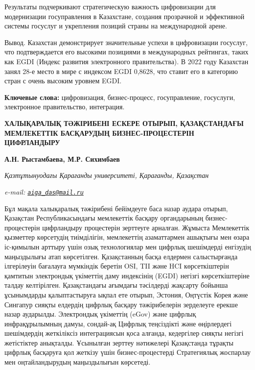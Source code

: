 Результаты подчеркивают стратегическую важность цифровизации для
модернизации госуправления в Казахстане, создания прозрачной и
эффективной системы госуслуг и укрепления позиций страны на
международной арене.

Вывод. Казахстан демонстрирует значительные успехи в цифровизации
госуслуг, что подтверждается его высокими позициями в международных
рейтингах, таких как EGDI (Индекс развития электронного правительства).
В 2022 году Казахстан занял 28-е место в мире с индексом EGDI 0,8628,
что ставит его в категорию стран с очень высоким уровнем EGDI.

{\bfseries Ключевые слова:} цифровизация, бизнес-процесс, госуправление,
госуслуги, электронное правительство, интеграция.

\begin{articleheader}
{\bfseries ХАЛЫҚАРАЛЫҚ ТӘЖІРИБЕНІ ЕСКЕРЕ ОТЫРЫП, ҚАЗАҚСТАНДАҒЫ МЕМЛЕКЕТТІК БАСҚАРУДЫҢ БИЗНЕС-ПРОЦЕСТЕРІН ЦИФРЛАНДЫРУ}

{\bfseries  
А.Н. Рыстамбаева\textsuperscript{\envelope },  
М.Р. Сихимбаев}
\end{articleheader}

\begin{affiliation}
\emph{Қазтұтынуодағы Қарағанды университеті, Қарағанды, Қазақстан}

\emph{e-mail: \href{mailto:aiga_das@mail.ru}{\nolinkurl{aiga\_das@mail.ru}}}
\end{affiliation}

Бұл мақала халықаралық тәжірибені бейімдеуге баса назар аудара отырып,
Қазақстан Республикасындағы мемлекеттік басқару органдарының
бизнес-процестерін цифрландыру процестерін зерттеуге арналған. Жұмыста
Мемлекеттік қызметтер көрсетудің тиімділігін, мемлекеттің азаматтармен
ашықтығы мен өзара іс-қимылын арттыру үшін озық технологиялар мен
цифрлық шешімдерді енгізудің маңыздылығы атап көрсетілген. Қазақстанның
басқа елдермен салыстырғанда ілгерілеуін бағалауға мүмкіндік беретін
OSI, TII және HCI көрсеткіштерін қамтитын электрондық үкіметтің даму
индексінің (EGDI) негізгі көрсеткіштеріне талдау келтірілген.
Қазақстандағы ағымдағы тәсілдерді жақсарту бойынша ұсынымдарды
қалыптастыруға ықпал ете отырып, Эстония, Оңтүстік Корея және Сингапур
сияқты елдердің цифрлық басқару тәжірибелерін зерделеуге ерекше назар
аударылды. Электрондық үкіметтің (eGov) және цифрлық инфрақұрылымның
дамуы, сондай-ақ Цифрлық теңсіздікті және өңірлердегі шешімдердің
жеткіліксіз интеграциясын қоса алғанда, кедергілер сияқты негізгі
жетістіктер анықталды. Ұсынылған зерттеу нәтижелері Қазақстанда тұрақты
цифрлық басқаруға қол жеткізу үшін бизнес-процестерді Стратегиялық
жоспарлау мен оңтайландырудың маңыздылығын көрсетеді.


